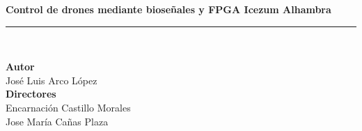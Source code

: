 \begin{titlepage}
 
 
\setlength{\centeroffset}{-0.5\oddsidemargin}
\addtolength{\centeroffset}{0.5\evensidemargin}
\thispagestyle{empty}

\noindent\hspace*{\centeroffset}\begin{minipage}{\textwidth}

\centering



 \vspace{3.3cm}


{\Huge\bfseries Control de drones mediante bioseñales y FPGA Icezum Alhambra\\
}
\noindent\rule[-1ex]{\textwidth}{3pt}\\[3.5ex]

\end{minipage}

\vspace{2.5cm}
\noindent\hspace*{\centeroffset}\begin{minipage}{\textwidth}
\centering

\textbf{Autor}\\ {José Luis Arco López}\\[2.5ex]
\textbf{Directores}\\
{Encarnación Castillo Morales\\
Jose María Cañas Plaza}\\[2cm]
\end{minipage}

 
\end{titlepage}


